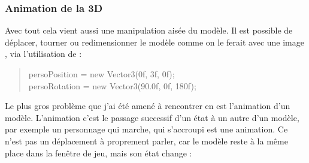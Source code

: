 \documentclass{article}
\begin{document}
\newpage
\subsubsection{Animation de la 3D}
Avec tout cela vient aussi une manipulation aisée du modèle. Il est possible de déplacer, tourner ou redimensionner le modèle  comme on le ferait avec une image , via l'utilisation de  : 
\begin{quote}
persoPosition = new Vector3(0f, 3f, 0f);\\
persoRotation = new Vector3(90.0f, 0f, 180f);
\end{quote}

Le plus gros problème que j'ai été amené à rencontrer en  est l'animation d'un modèle. L'animation c'est le passage successif d'un état à un autre d'un modèle, par exemple un personnage qui marche, qui s'accroupi est une animation. Ce n'est pas un déplacement à proprement parler, car le modèle  reste à la même place dans la fenêtre de jeu, mais son état change : 
\end{document}

